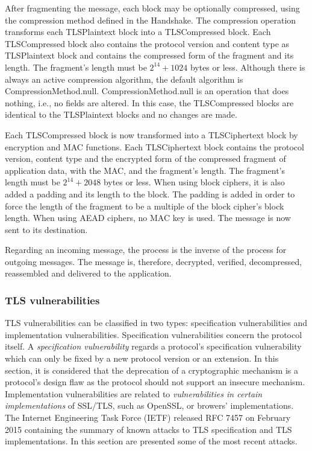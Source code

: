 \documentclass{sig-alternate-05-2015}
\begin{document}
After fragmenting the message, each block may be optionally compressed, using the compression method defined in the Handshake. 
The compression operation transforms each TLSPlaintext block into a TLSCompressed block. Each TLSCompressed block also contains the protocol version and content type as TLSPlaintext block and contains the compressed form of the fragment and its length. The fragment's length must be $2^{14} + 1024$ bytes or less.
Although there is always an active compression algorithm, the default algorithm is CompressionMethod.null. CompressionMethod.null is an operation that does nothing, i.e., no fields are altered. In this case, the TLSCompressed blocks are identical to the TLSPlaintext blocks and no changes are made.

Each TLSCompressed block is now transformed into a TLSCiphertext block by encryption and MAC functions. Each TLSCiphertext block contains the protocol version, content type and the encrypted form of the compressed fragment of application data, with the MAC, and the fragment's length.  The fragment's length must be $2^{14} + 2048$ bytes or less. When using block ciphers, it is also added a padding and its length to the block. The padding is added in order to force the length of the fragment to be a multiple of the block cipher's block length. When using AEAD ciphers, no MAC key is used.
The message is now sent to its destination.

Regarding an incoming message, the process is the inverse of the process for outgoing messages. The message is, therefore, decrypted, verified, decompressed, reassembled and delivered to the application.

\subsubsection{TLS vulnerabilities}
\label{tls-vulnerabilities}

TLS vulnerabilities can be classified in two types: specification vulnerabilities and implementation vulnerabilities. Specification vulnerabilities concern the protocol itself. A \textit{specification vulnerability} regards a protocol's specification vulnerability which can only be fixed by a new protocol version or an extension. In this section, it is considered that the deprecation of a cryptographic mechanism is a protocol's design flaw as the protocol should not support an insecure mechanism.
Implementation vulnerabilities are related to \textit{vulnerabilities in certain implementations} of SSL/TLS, such as OpenSSL, or browers' implementations.
The Internet Engineering Task Force (IETF) released RFC 7457 \cite{RFC7457} on February 2015 containing the summary of known attacks to TLS specification and TLS implementations. In this section are presented some of the most recent attacks.
\end{document}

